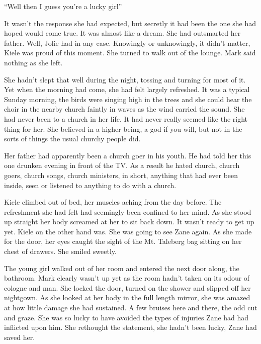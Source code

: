 ``Well then I guess you're a lucky girl''

It wasn't the response she had expected, but secretly it had been the one she had hoped would come true.  It was almost like a dream.  She had outsmarted her father.  Well, Jolie had in any case.  Knowingly or unknowingly, it didn't matter, Kiele was proud of this moment.  She turned to walk out of the lounge.  Mark said nothing as she left.



\thoughtbreak



She hadn't slept that well during the night, tossing and turning for most of it.  Yet when the morning had come, she had felt largely refreshed.  It was a typical Sunday morning, the birds were singing high in the trees and she could hear the choir in the nearby church faintly in waves as the wind carried the sound.  She had never been to a church in her life.  It had never really seemed like the right thing for her.  She believed in a higher being, a god if you will, but not in the sorts of things the usual churchy people did.  

Her father had apparently been a church goer in his youth.  He had told her this one drunken evening in front of the TV.  As a result he hated church, church goers, church songs, church ministers, in short, anything that had ever been inside, seen or listened to anything to do with a church.

Kiele climbed out of bed, her muscles aching from the day before.  The refreshment she had felt had seemingly been confined to her mind.  As she stood up straight her body screamed at her to sit back down.  It wasn't ready to get up yet.  Kiele on the other hand was.  She was going to see Zane again.  As she made for the door, her eyes caught the sight of the Mt. Taleberg bag sitting on her chest of drawers.  She smiled sweetly.

The young girl walked out of her room and entered the next door along, the bathroom.  Mark clearly wasn't up yet as the room hadn't taken on its odour of cologne and man.  She locked the door, turned on the shower and slipped off her nightgown.  As she looked at her body in the full length mirror, she was amazed at how little damage she had sustained.  A few bruises here and there, the odd cut and graze.  She was so lucky to have avoided the types of injuries Zane had had inflicted upon him.  She rethought the statement, she hadn't been lucky, Zane had saved her.

